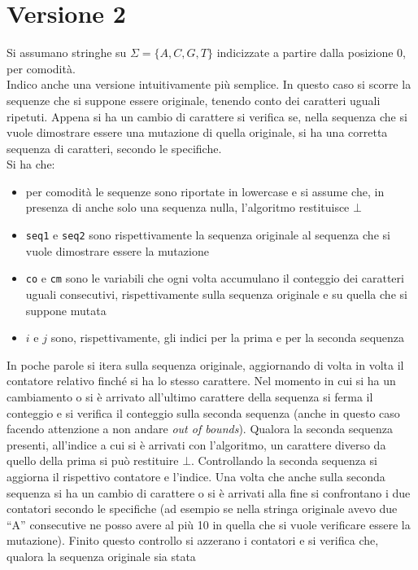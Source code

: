 \documentclass[a4paper,12pt, oneside]{book}
\begin{document}
\section{Versione 2}
Si assumano stringhe su $\Sigma=\{A,C,G,T\}$ indicizzate a partire dalla
posizione 0, per comodità.\\
Indico anche una versione intuitivamente più semplice. In questo caso si scorre
la sequenze che si suppone essere 
originale, tenendo conto dei caratteri uguali ripetuti. Appena si ha un cambio
di carattere si verifica se, nella sequenza che si vuole dimostrare essere una
mutazione di quella originale, si ha una corretta sequenza di caratteri, secondo
le specifiche.\\
Si ha che:
\begin{itemize}
  \item per comodità le sequenze sono riportate in lowercase e si assume che, in
  presenza di anche solo una sequenza nulla, l'algoritmo restituisce $\bot$
  \item \texttt{seq1} e \texttt{seq2} sono rispettivamente la sequenza originale
  al sequenza che si vuole dimostrare essere la mutazione
  \item \texttt{co} e \texttt{cm} sono le variabili che ogni volta
  accumulano il conteggio dei caratteri uguali consecutivi, rispettivamente
  sulla sequenza originale e su quella che si suppone mutata 
  \item $i$ e $j$ sono, rispettivamente, gli indici per la prima e per la
  seconda sequenza 
\end{itemize}
In poche parole si itera sulla sequenza originale, aggiornando di volta in volta
il contatore relativo finché si ha lo stesso carattere. Nel momento in cui si ha
un cambiamento o si è arrivato all'ultimo carattere della sequenza si ferma il
conteggio e si verifica il conteggio sulla seconda sequenza (anche in questo
caso facendo attenzione a non andare \textit{out of bounds}). Qualora la seconda
sequenza presenti, all'indice a cui si è arrivati con l'algoritmo, un carattere
diverso da quello della prima si può restituire $\bot$. Controllando la
seconda sequenza si aggiorna il rispettivo contatore e l'indice. Una volta che
anche sulla seconda sequenza si ha un cambio di carattere o si è arrivati alla
fine si confrontano i due contatori secondo le specifiche (ad esempio se nella
stringa originale avevo due ``A'' consecutive ne posso avere al più 10 in quella
che si vuole verificare essere la mutazione). Finito questo controllo si
azzerano i contatori e si verifica che, qualora la sequenza originale sia stata
\end{document}
